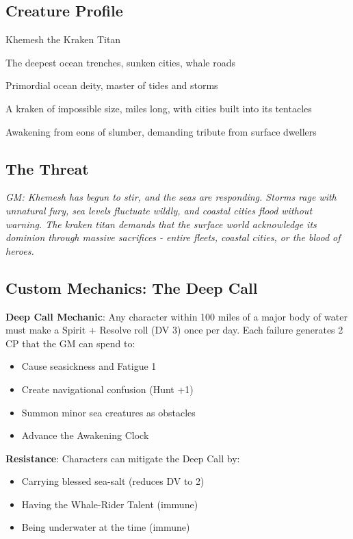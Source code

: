 \documentclass[11pt]{article}
\newcommand{\gm}[1]{\textit{GM: #1}}
\begin{document}
\subsection*{Creature Profile}

\begin{description}[leftmargin=*]
\item[Name] Khemesh the Kraken Titan
\item[Domain] The deepest ocean trenches, sunken cities, whale roads
\item[Nature] Primordial ocean deity, master of tides and storms
\item[Appearance] A kraken of impossible size, miles long, with cities built into its tentacles
\item[Motivation] Awakening from eons of slumber, demanding tribute from surface dwellers
\end{description}

\subsection*{The Threat}

\gm{Khemesh has begun to stir, and the seas are responding. Storms rage with unnatural fury, sea levels fluctuate wildly, and coastal cities flood without warning. The kraken titan demands that the surface world acknowledge its dominion through massive sacrifices - entire fleets, coastal cities, or the blood of heroes.}

\subsection*{Custom Mechanics: The Deep Call}

\begin{mdframed}[backgroundcolor=mechanicbg]
\textbf{Deep Call Mechanic}: Any character within 100 miles of a major body of water must make a Spirit + Resolve roll (DV 3) once per day. Each failure generates 2 CP that the GM can spend to:
\begin{itemize}[leftmargin=*]
\item Cause seasickness and Fatigue 1
\item Create navigational confusion (Hunt +1)
\item Summon minor sea creatures as obstacles
\item Advance the Awakening Clock
\end{itemize}

\textbf{Resistance}: Characters can mitigate the Deep Call by:
\begin{itemize}[leftmargin=*]
\item Carrying blessed sea-salt (reduces DV to 2)
\item Having the Whale-Rider Talent (immune)
\item Being underwater at the time (immune)
\end{itemize}
\end{mdframed}
\end{document}
